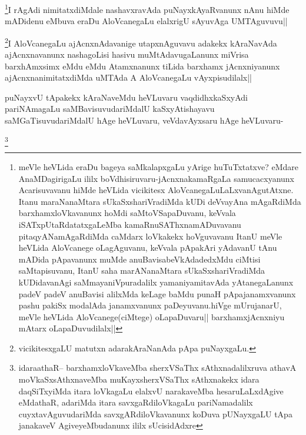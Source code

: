 \begin{artha}
\footnote{meVle heVLida eraDu bageya saMkalapxgaLu yArige huTuTxtatxve? eMdare AnaMDagirigaLu ililx boVdhisiruvaru-jAcnxnakamaRgaLa samucacxyanunx Acarisuvavanu hiMde heVLida vicikitesx AloVcanegaLuLaLxvanAgutAtxne. Itanu maraNanaMtara sUkaSxshariVradiMda kUDi deVvayAna mAgaRdiMda barxhamxloVkavanunx hoMdi saMtoVSapaDuvanu, keVvala iSATxpUtaRdatatxgaLeMba kamaRnuSAThxnamADuvavanu pitaqyANamAgaRdiMda caMdarx loVkakekx hoVguvavanu ItanU meVle heVLida AloVcanege oLagAguvanu, keVvala pApakAri yAdavanU tAnu mADida pApavanunx muMde anuBavisabeVkAdadedxMdu ciMtisi saMtapisuvanu, ItanU saha marANanaMtara sUkaSxshariVradiMda kUDidavanAgi saMmayaniVpuradalilx yamaniyamitavAda yAtanegaLanunx padeV padeV anuBavisi alilxMda keLage baMdu punaH pApajanamxvanunx pashu pakiSx modalAda janamxvanunx paDeyuvanu.hiVge mUrujanarU, meVle heVLida AloVcanege(ciMtege) oLapaDuvaru|| barxhamxjAcnxniyu mAtarx oLapaDuvudilalx||}I rAgAdi nimitatxdiMdale nashavxravAda puNayxkAyaRvanunx nAnu hiMde mADidenu eMbuva eraDu AloVcanegaLu elalxrigU sAyuvAga UMTAguvuvu||
\end{artha}

\begin{artha}
\footnote{vicikitesxgaLU matutxn adarakAraNanAda pApa puNayxgaLu.}I AloVcanegaLu ajAcnxnAdavanige utapxnAguvavu adakekx kAraNavAda ajAcnxnavanunx nashagoLisi hasivu muMtAdavugaLanunx miVrisa barxhAmxsimx eMdu eMdu Atamxnanunx tiLida barxhamx jAcnxniyanunx ajAcnxnanimitatxdiMda uMTAda A AloVcanegaLu vAyxpisudilalx||
\end{artha}


\begin{artha}
puNayxvU tApakekx kAraNaveMdu heVLuvaru vaqdidhxkaSxyAdi pariNAmagaLu saMBavisuvudariMdalU kaSxyAtishayavu saMGaTisuvudariMdalU hAge heVLuvaru, veVdavAyxsaru hAge heVLuvaru-
\end{artha}

\begin{artha}
\footnote{idaraathaR-- barxhamxloVkaveMba sherxVSaThx sAthxnadalilxruva athavA moVkaSxsAthxnaveMba muKayxsherxVSaThx sAthxnakekx idara daqSiTxyiMda itara loVkagaLu elalxvU narakaveMba hesaruLaLxdAgive eMdathaR, adariMda itara savxgaRdiloVkagaLu pariNamadalilx cuyxtavAguvudariMda savxgARdiloVkavanunx koDuva pUNayxgaLU tApa janakaveV AgiveyeMbudanunx ililx sUcisidAdxre}
\end{artha}
